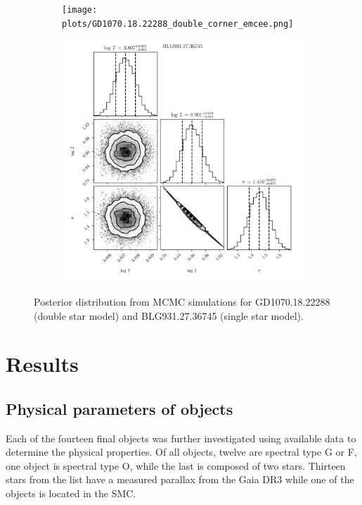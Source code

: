 \documentclass{pracalicmgr}
\begin{document}
\begin{figure}
    \begin{subfigure}{1\textwidth}
        \centering
       \texttt{[image: plots/GD1070.18.22288\_double\_corner\_emcee.png]}
       \label{fig:Ng1} 
    \end{subfigure}
    
    \begin{subfigure}{1\textwidth}
        \centering
       \includegraphics[scale=0.5]{plots/BLG931.27.36745_simple_corner_emcee.png}
    \end{subfigure}
    \caption{Posterior distribution from MCMC simulations for GD1070.18.22288 (double star model)
    and BLG931.27.36745 (single star model).}\label{corner_1}
\end{figure}
\chapter{Results}
\section{Physical parameters of objects}
Each of the fourteen final objects was further investigated using available data to determine the physical properties.
Of all objects, twelve are spectral type G or F, one object is spectral type O, while the last is composed of two stars.
Thirteen stars from the list have a measured parallax from the Gaia DR3 while one of the objects is located in the SMC.
\end{document}
